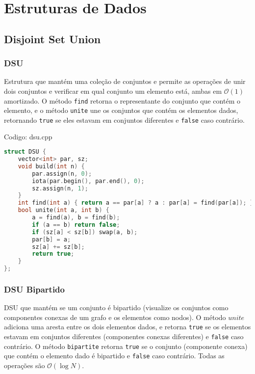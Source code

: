 \documentclass[10pt, a4paper, oneside]{book}
\begin{document}
\newpage

%
%
%
%

\chapter{Estruturas de Dados}

\section{Disjoint Set Union}
\subsection{DSU}


Estrutura que mantém uma coleção de conjuntos e permite as operações de unir dois conjuntos e verificar em qual conjunto um elemento está, ambas em $\mathcal{O}(1)$ amortizado. O método \texttt{find} retorna o representante do conjunto que contém o elemento, e o método \texttt{unite} une os conjuntos que contém os elementos dados, retornando \texttt{true} se eles estavam em conjuntos diferentes e \texttt{false} caso contrário.

\hfill

Codigo: dsu.cpp

\begin{lstlisting}[language=C++]
struct DSU {
    vector<int> par, sz;
    void build(int n) {
        par.assign(n, 0);
        iota(par.begin(), par.end(), 0);
        sz.assign(n, 1);
    }
    int find(int a) { return a == par[a] ? a : par[a] = find(par[a]); }
    bool unite(int a, int b) {
        a = find(a), b = find(b);
        if (a == b) return false;
        if (sz[a] < sz[b]) swap(a, b);
        par[b] = a;
        sz[a] += sz[b];
        return true;
    }
};
\end{lstlisting}
\hfill

\subsection{DSU Bipartido}


DSU que mantém se um conjunto é bipartido (visualize os conjuntos como componentes conexas de um grafo e os elementos como nodos). O método $unite$ adiciona uma aresta entre os dois elementos dados, e retorna \texttt{true} se os elementos estavam em conjuntos diferentes (componentes conexas diferentes) e \texttt{false} caso contrário. O método \texttt{bipartite} retorna \texttt{true} se o conjunto (componente conexa) que contém o elemento dado é bipartido e \texttt{false} caso contrário. Todas as operações são $\mathcal{O}(\log N)$.
\end{document}
